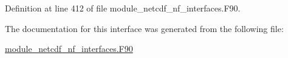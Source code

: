 Definition at line 412 of file module\+\_\+netcdf\+\_\+nf\+\_\+interfaces.\+F90.



The documentation for this interface was generated from the following file\+:\begin{DoxyCompactItemize}
\item 
\hyperlink{module__netcdf__nf__interfaces_8F90}{module\+\_\+netcdf\+\_\+nf\+\_\+interfaces.\+F90}\end{DoxyCompactItemize}

